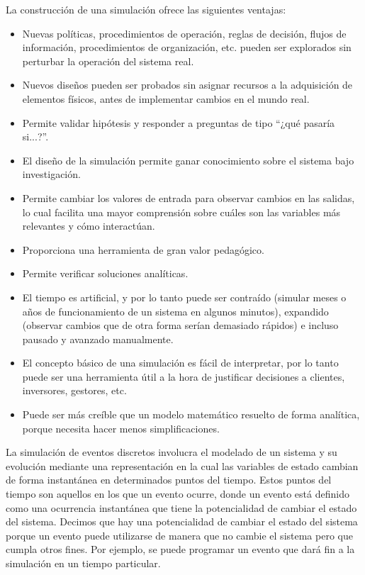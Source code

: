 \documentclass[]{article}
\begin{document}
La construcción de una simulación ofrece las siguientes ventajas:
\begin{itemize}
    \item Nuevas políticas, procedimientos de operación, reglas de decisión,
flujos de información, procedimientos de organización, etc. pueden ser
explorados sin perturbar la operación del sistema real.

    \item Nuevos diseños pueden ser probados sin asignar recursos a la
adquisición de elementos físicos, antes de implementar cambios en el mundo
real.

    \item Permite validar hipótesis y responder a preguntas de tipo ``¿qué
pasaría si...?''.

    \item El diseño de la simulación permite ganar conocimiento sobre el
sistema bajo investigación.

    \item Permite cambiar los valores de entrada para observar cambios en las
salidas, lo cual facilita una mayor comprensión sobre cuáles son las variables
más relevantes y cómo interactúan.

    \item Proporciona una herramienta de gran valor pedagógico.

    \item Permite verificar soluciones analíticas.

    \item El tiempo es artificial, y por lo tanto puede ser contraído (simular
meses o años de funcionamiento de un sistema en algunos minutos), expandido
(observar cambios que de otra forma serían demasiado rápidos) e incluso pausado
y avanzado manualmente.

    \item El concepto básico de una simulación es fácil de interpretar, por lo
tanto puede ser una herramienta útil a la hora de justificar decisiones a
clientes, inversores, gestores, etc.

    \item Puede ser más creíble que un modelo matemático resuelto de forma
analítica, porque necesita hacer menos simplificaciones.
\end{itemize}

La simulación de eventos discretos involucra el modelado de un sistema y su
evolución mediante una representación en la cual las variables de estado
cambian de forma instantánea en determinados puntos del tiempo. Estos puntos
del tiempo son aquellos en los que un evento ocurre, donde un evento está
definido como una ocurrencia instantánea que tiene la potencialidad de cambiar
el estado del sistema. Decimos que hay una potencialidad de cambiar el estado
del sistema porque un evento puede utilizarse de manera que no cambie el
sistema pero que cumpla otros fines. Por ejemplo, se puede programar un evento
que dará fin a la simulación en un tiempo particular.
\end{document}

